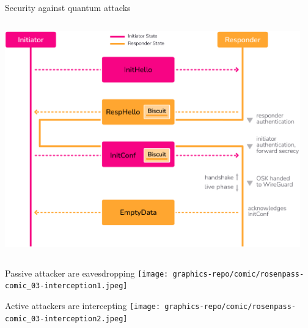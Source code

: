 \begin{frame}{Security against quantum attacks}
  \begin{columns}[fullwidth,c]
    \begin{column}{.6\linewidth}
      \includegraphics[height=\defaultframetextheight]{graphics/rosenpass-wp-key-exchange-protocol-rgb.pdf}
    \end{column}

    \begin{column}{.4\linewidth}
    \end{column}
  \end{columns}
\end{frame}


\begin{frame}{Passive attacker are eavesdropping}
  \texttt{[image: graphics-repo/comic/rosenpass-comic\_03-interception1.jpeg]}
\end{frame}

\begin{frame}{Active attackers are intercepting}
  \texttt{[image: graphics-repo/comic/rosenpass-comic\_03-interception2.jpeg]}
\end{frame}

